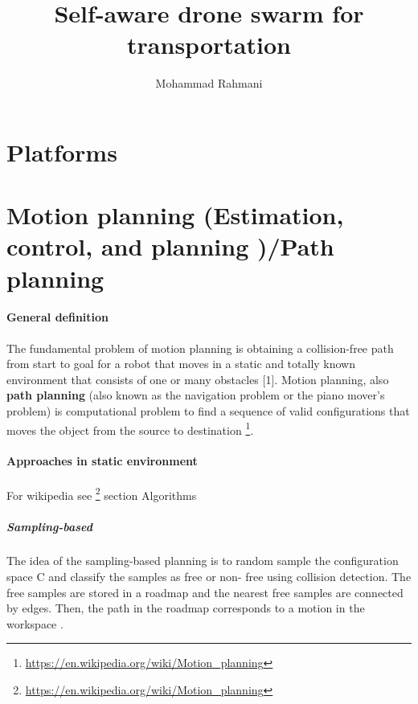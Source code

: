 \documentclass{article}
\begin{document}
	
	\title{Self-aware drone swarm for transportation}
	\author{Mohammad Rahmani}
	\date{}
	\maketitle
	\section{Platforms}
		\cite{mrs-felk-cvut-cz-2020-micro-aerial-vehicles-platforms}
	\section{Motion planning (Estimation, control, and planning )/Path planning}
		\paragraph{General definition}
		The fundamental problem of motion planning is obtaining a collision-free path from start to goal for a robot that moves in a
		static and totally known environment that consists of one or many obstacles  \cite{mohanan-2018-a-survey-of-robotic-motion-planning-in-dynamic-environments}[1].
		Motion planning, also \textbf{path planning} (also known as the navigation problem or the piano mover's problem) is computational problem to find a sequence of valid configurations that moves the object from the source to destination \footnote{\url{https://en.wikipedia.org/wiki/Motion_planning}}.
		
		\paragraph{Approaches in static environment}
			For wikipedia see \footnote{\url{https://en.wikipedia.org/wiki/Motion_planning}} section Algorithms
			\subparagraph{Sampling-based} 
			The idea of the sampling-based planning is to random sample the configuration space C and classify the samples as free or non-	free using collision detection. The free samples are stored in a roadmap and the nearest free samples are connected by edges.
			Then, the path in the roadmap corresponds to a motion in the workspace \cite{spurny-2019-cooperative-transport-of-large-objects-by-a-pair-of-unmanned-aerial-systems-using-sampling-based-motion-planning}.
			
\end{document}
